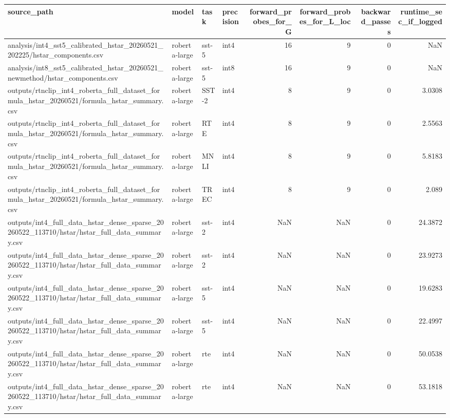 \begin{table}[t]
\centering
\begin{tabular}{llllrrrr}
\toprule
source\_path & model & task & precision & forward\_probes\_for\_G & forward\_probes\_for\_L\_loc & backward\_passes & runtime\_sec\_if\_logged \\
\midrule
analysis/int4\_sst5\_calibrated\_hstar\_20260521\_202225/hstar\_components.csv & roberta-large & sst-5 & int4 & 16 & 9 & 0 & NaN \\
analysis/int8\_sst5\_calibrated\_hstar\_20260521\_newmethod/hstar\_components.csv & roberta-large & sst-5 & int8 & 16 & 9 & 0 & NaN \\
outputs/rtnclip\_int4\_roberta\_full\_dataset\_formula\_hstar\_20260521/formula\_hstar\_summary.csv & roberta-large & SST-2 & int4 & 8 & 9 & 0 & 3.0308 \\
outputs/rtnclip\_int4\_roberta\_full\_dataset\_formula\_hstar\_20260521/formula\_hstar\_summary.csv & roberta-large & RTE & int4 & 8 & 9 & 0 & 2.5563 \\
outputs/rtnclip\_int4\_roberta\_full\_dataset\_formula\_hstar\_20260521/formula\_hstar\_summary.csv & roberta-large & MNLI & int4 & 8 & 9 & 0 & 5.8183 \\
outputs/rtnclip\_int4\_roberta\_full\_dataset\_formula\_hstar\_20260521/formula\_hstar\_summary.csv & roberta-large & TREC & int4 & 8 & 9 & 0 & 2.089 \\
outputs/int4\_full\_data\_hstar\_dense\_sparse\_20260522\_113710/hstar/hstar\_full\_data\_summary.csv & roberta-large & sst-2 & int4 & NaN & NaN & 0 & 24.3872 \\
outputs/int4\_full\_data\_hstar\_dense\_sparse\_20260522\_113710/hstar/hstar\_full\_data\_summary.csv & roberta-large & sst-2 & int4 & NaN & NaN & 0 & 23.9273 \\
outputs/int4\_full\_data\_hstar\_dense\_sparse\_20260522\_113710/hstar/hstar\_full\_data\_summary.csv & roberta-large & sst-5 & int4 & NaN & NaN & 0 & 19.6283 \\
outputs/int4\_full\_data\_hstar\_dense\_sparse\_20260522\_113710/hstar/hstar\_full\_data\_summary.csv & roberta-large & sst-5 & int4 & NaN & NaN & 0 & 22.4997 \\
outputs/int4\_full\_data\_hstar\_dense\_sparse\_20260522\_113710/hstar/hstar\_full\_data\_summary.csv & roberta-large & rte & int4 & NaN & NaN & 0 & 50.0538 \\
outputs/int4\_full\_data\_hstar\_dense\_sparse\_20260522\_113710/hstar/hstar\_full\_data\_summary.csv & roberta-large & rte & int4 & NaN & NaN & 0 & 53.1818 \\

\end{tabular}
\end{table}
